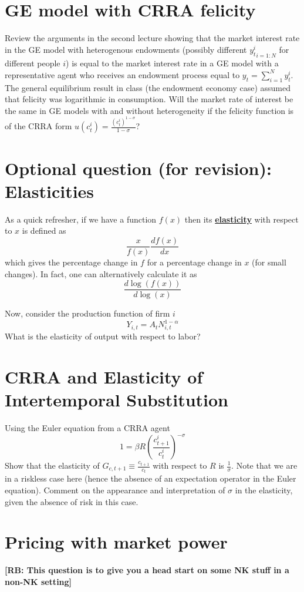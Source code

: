 \documentclass[authoryear,11pt]{elsarticle}
\begin{document}
\section{GE model with CRRA felicity}
Review the arguments in the second lecture showing that the market interest rate in the GE model with heterogenous endowments (possibly different ${y_{t}^{i}}_{i=1:N}$ for different people $i$) is equal to the market interest rate in a GE model with a representative agent who receives an endowment process equal to $y_{t}=\sum\limits_{i=1}^{N}y_{t}^{i}$. The general equilibrium result in class (the endowment economy case) assumed that felicity was logarithmic in consumption. Will the market rate of interest be the same in GE models with and without heterogeneity if the felicity function is of the CRRA form $u(c_{t}^{i})=\frac{(c_{t}^{i})^{1-\sigma }}{1-\sigma }$?


\section{Optional question (for revision): Elasticities}
As a quick refresher, if we have a function $f(x)$ then its \href{https://en.wikipedia.org/wiki/Elasticity_of_a_function}{\textbf{elasticity}} with respect to $x$ is defined as
\[
 \frac{x}{f(x)} \frac{df(x)}{dx}
\]
which gives the percentage change in $f$ for a percentage change in $x$ (for small changes). In fact, one can alternatively calculate it as
\[
\frac{d \log{(f(x))}}{d \log{(x)} }
\]

Now, consider the production function of firm $i$
\[
Y_{i,t} = A_{t} N_{i,t}^{1-\alpha}
\]
What is the elasticity of output with respect to labor?

\section{CRRA and Elasticity of Intertemporal Substitution}
Using the Euler equation from a CRRA agent
\[
1 = \beta R \left( \frac{c^{i}_{t+1}}{c^{i}_{t}} \right)^{-\sigma}
\]
Show that the elasticity of $G_{c,t+1} \equiv \frac{c_{t+1}}{c_{t}}$ with respect to $R$ is $\frac{1}{\sigma}$. Note that we are in a riskless case here (hence the absence of an expectation operator in the Euler equation). Comment on the appearance and interpretation of $\sigma$ in the elasticity, given the absence of risk in this case.

\section{Pricing with market power}
\textbf{[RB: This question is to give you a head start on some NK stuff in a non-NK setting]}
\end{document}
